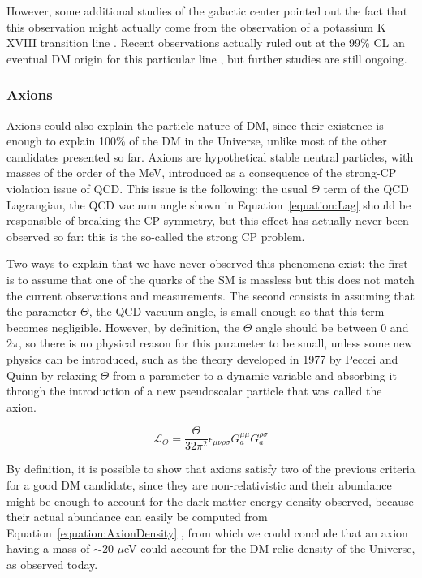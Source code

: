 \documentclass[a4paper, 10pt, openright]{report}
\begin{document}
However, some additional studies of the galactic center pointed out the fact that this observation might actually come from the observation of a potassium K XVIII transition line \cite{NoDetection}. Recent observations actually ruled out at the 99\% \ac{CL} an eventual \ac{DM} origin for this particular line \cite{Nope}, but further studies are still ongoing.

\subsubsection*{Axions}
Axions could also explain the particle nature of \ac{DM}, since their existence is enough to explain 100\% of the \ac{DM} in the Universe, unlike most of the other candidates presented so far. Axions are hypothetical stable neutral particles, with masses of the order of the MeV, introduced as a consequence of the strong-CP violation issue of \ac{QCD}. This issue is the following: the usual $\Theta$ term of the \ac{QCD} Lagrangian, the \ac{QCD} vacuum angle shown in Equation~\ref{equation:Lag} \cite{QCDLag} should be responsible of breaking the CP symmetry, but this effect has actually never been observed so far: this is the so-called the strong CP problem. 

Two ways to explain that we have never observed this phenomena exist: the first is to assume that one of the quarks of the \ac{SM} is massless but this does not match the current observations and measurements. The second consists in assuming that the parameter $\Theta$, the \ac{QCD} vacuum angle, is small enough so that this term becomes negligible. However, by definition, the $\Theta$ angle should be between 0 and $2\pi$, so there is no physical reason for this parameter to be small, unless some new physics can be introduced, such as the theory developed in 1977 by Peccei and Quinn \cite{Peccei} by relaxing $\Theta$ from a parameter to  a dynamic variable and absorbing it through the introduction of a new pseudoscalar particle that was called the axion.

\begin{equation}
\label{equation:Lag}
\mathcal{L}_\Theta = \frac{\Theta}{32 \pi^2} \epsilon_{\mu \nu \rho \sigma} G_a^{\mu \mu} G_a^{\rho \sigma}
\end{equation}

By definition, it is possible to show that axions satisfy two of the previous criteria for a good \ac{DM} candidate, since they are non-relativistic and their abundance might be enough to account for the dark matter energy density observed, because their actual abundance can easily be computed from Equation~\ref{equation:AxionDensity} \cite{AxionSearches}, from which we could conclude that an axion having a mass of $\sim$20 $\mu$eV could account for the \ac{DM} relic density of the Universe, as observed today. 
\end{document}
